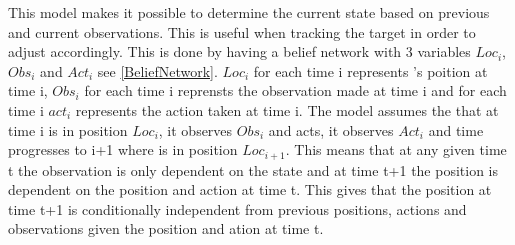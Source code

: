 This model makes it possible to determine the current state based on previous
and current observations. This is useful when tracking the target in order to
adjust \namep accordingly. This is done by having a belief network with 3
variables $Loc_i$, $Obs_i$ and $Act_i$ see \autoref{BeliefNetwork}. $Loc_i$ for
each time i represents \name's poition at time i, $Obs_i$ for each time i reprensts the observation
made at time i and for each time i $act_i$ represents the action taken at time
i. The model assumes the that at time i \namep is in position $Loc_i$, it
observes $Obs_i$ and acts, it observes $Act_i$ and time progresses to i+1 where
\namep is in position $Loc_{i+1}$. This means that at any given time t the
observation is only dependent on the state and at time t+1 the position is
dependent on the position and action at time t. This gives that the position
at time t+1 is conditionally independent from previous positions, actions and
observations given the position and ation at time t. 


